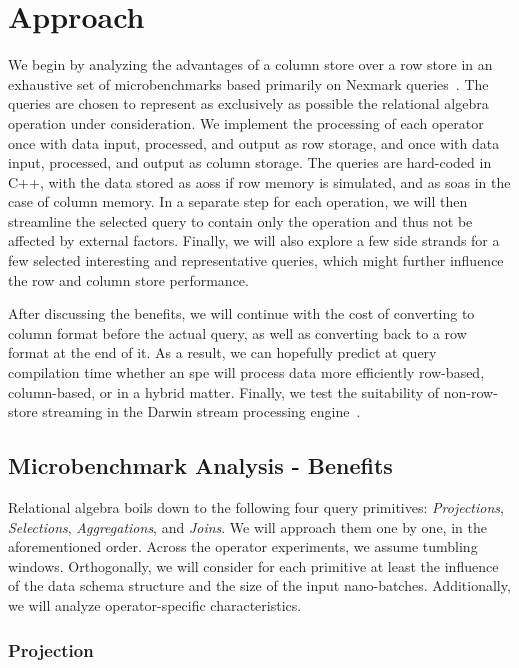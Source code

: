 \section{Approach}
\label{sec:approach}

We begin by analyzing the advantages of a column store over a row store in an exhaustive set of microbenchmarks based primarily on Nexmark queries~\cite{tucker2008nexmark}.
The queries are chosen to represent as exclusively as possible the relational algebra operation under consideration.
We implement the processing of each operator once with data input, processed, and output as row storage, and once with data input, processed, and output as column storage.
The queries are hard-coded in C++, with the data stored as \acp{aos} if row memory is simulated, and as \acp{soa} in the case of column memory.
In a separate step for each operation, we will then streamline the selected query to contain only the operation and thus not be affected by external factors.
Finally, we will also explore a few side strands for a few selected interesting and representative queries, which might further influence the row and column store performance.

After discussing the benefits, we will continue with the cost of converting to column format before the actual query, as well as converting back to a row format at the end of it.
As a  result, we can hopefully predict at query compilation time whether an \ac{spe} will process data more efficiently row-based, column-based, or in a hybrid matter.
Finally, we test the suitability of non-row-store streaming in the Darwin stream processing engine~\cite[]{DBLP:conf/cidr/BensonR22}.

\subsection{Microbenchmark Analysis - Benefits}
Relational algebra boils down to the following four query primitives: \emph{Projections}, \emph{Selections}, \emph{Aggregations}, and \emph{Joins}.
We will approach them one by one, in the aforementioned order.
Across the operator experiments, we assume tumbling windows.
Orthogonally, we will consider for each primitive at least the influence of the data schema structure and the size of the input nano-batches.
Additionally, we will analyze operator-specific characteristics.

\subsubsection{Projection}

